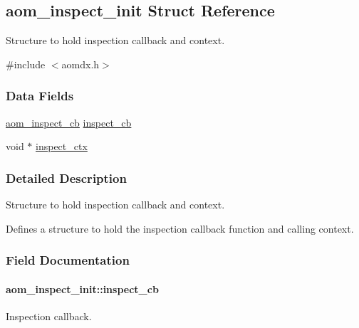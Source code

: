 \hypertarget{structaom__inspect__init}{}\subsection{aom\+\_\+inspect\+\_\+init Struct Reference}
\label{structaom__inspect__init}


Structure to hold inspection callback and context.  




{\ttfamily \#include $<$aomdx.\+h$>$}

\subsubsection*{Data Fields}
\begin{DoxyCompactItemize}
\item 
\hyperlink{group__aom__decoder_ga1b37b4b76004e5a2776c2e2f16b052cd}{aom\+\_\+inspect\+\_\+cb} \hyperlink{structaom__inspect__init_a3a51c5f8c524cec7564fae85e047750b}{inspect\+\_\+cb}
\item 
void $\ast$ \hyperlink{structaom__inspect__init_a26c618c754d4b278fb636353e6b9d96d}{inspect\+\_\+ctx}
\end{DoxyCompactItemize}


\subsubsection{Detailed Description}
Structure to hold inspection callback and context. 

Defines a structure to hold the inspection callback function and calling context. 

\subsubsection{Field Documentation}
\paragraph[{\texorpdfstring{inspect\+\_\+cb}{inspect_cb}}]{ aom\+\_\+inspect\+\_\+init\+::inspect\+\_\+cb}\hypertarget{structaom__inspect__init_a3a51c5f8c524cec7564fae85e047750b}{}\label{structaom__inspect__init_a3a51c5f8c524cec7564fae85e047750b}
Inspection callback. 
